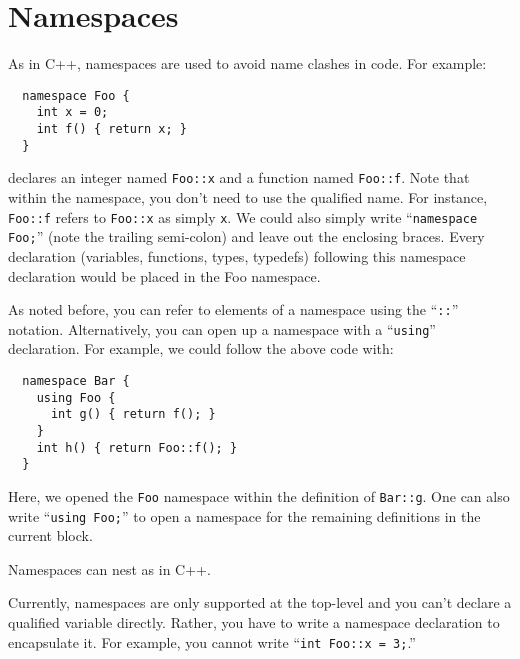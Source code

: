 \section{Namespaces}

As in C++, namespaces are used to avoid name clashes in code.  For
example:
\begin{verbatim}
  namespace Foo { 
    int x = 0; 
    int f() { return x; }  
  }
\end{verbatim}
declares an integer named \texttt{Foo::x} and a function named
\texttt{Foo::f}.  Note that within the namespace, you don't need to use
the qualified name.  For instance, \texttt{Foo::f} refers to
\texttt{Foo::x} as simply \texttt{x}.  We could also simply write
``\texttt{namespace Foo;}'' (note the trailing semi-colon) and leave out
the enclosing braces.  Every declaration (variables, functions, types,
typedefs) following this namespace declaration would be placed in the
Foo namespace.

As noted before, you can refer to elements of a namespace using the
``\texttt{::}'' notation.  Alternatively, you can open up a namespace
with a ``\texttt{using}'' declaration.  For example, we could follow the
above code with:
\begin{verbatim}
  namespace Bar {  
    using Foo { 
      int g() { return f(); } 
    } 
    int h() { return Foo::f(); } 
  }
\end{verbatim}

Here, we opened the \texttt{Foo} namespace within the definition of
\texttt{Bar::g}.  One can also write ``\texttt{using Foo;}'' to open a
namespace for the remaining definitions in the current block.

Namespaces can nest as in C++.  

Currently, namespaces are only supported at the top-level and you
can't declare a qualified variable directly.  Rather, you have to
write a namespace declaration to encapsulate it.  For example, you
cannot write ``\texttt{int Foo::x = 3;}.''

